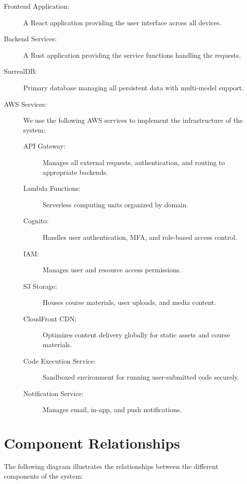 \documentclass[a4paper, 11pt]{scrreprt}
\begin{document}
\begin{description}
    \item[Frontend Application:] A React application providing the user interface across all devices.

    \item[Backend Services:] A Rust application providing the service functions handling the requests.
    
    \item[SurrealDB:] Primary database managing all persistent data with multi-model support.
    
    \item[AWS Services:] We use the following AWS services to implement the infrastructure of the system:
    \begin{description}
        \item[API Gateway:] Manages all external requests, authentication, and routing to appropriate backends.
        
        \item[Lambda Functions:] Serverless computing units organized by domain.
    
        \item[Cognito:] Handles user authentication, MFA, and role-based access control.
        
        \item[IAM:] Manages user and resource access permissions.
    
        \item[S3 Storage:] Houses course materials, user uploads, and media content.
    
        \item[CloudFront CDN:] Optimizes content delivery globally for static assets and course materials.
    
        \item[Code Execution Service:] Sandboxed environment for running user-submitted code securely.
        
        \item[Notification Service:] Manages email, in-app, and push notifications.
    \end{description}
\end{description}

\section{Component Relationships}
The following diagram illustrates the relationships between the different components of the system:
\end{document}

